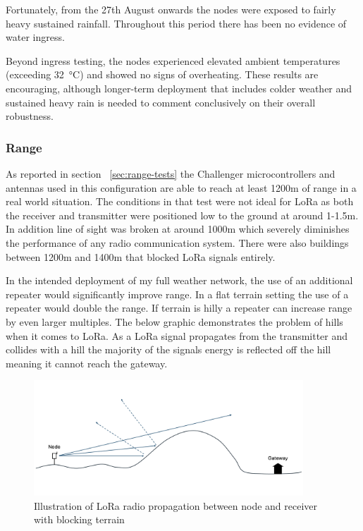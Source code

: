 Fortunately, from the 27th August onwards the nodes were exposed to fairly heavy
sustained rainfall. Throughout this period there has been no evidence of water
ingress.

Beyond ingress testing, the nodes experienced elevated ambient temperatures
(exceeding \SI{32}{\degreeCelsius}) and showed no signs of overheating. These
results are encouraging, although longer-term deployment that includes colder
weather and sustained heavy rain is needed to comment conclusively on their
overall robustness.

\subsubsection{Range}\label{sec:range-eval}

As reported in section ~\ref{sec:range-tests} the Challenger microcontrollers
and antennas used in this configuration are able to reach at least 1200m of
range in a real world situation. The conditions in that test were not ideal for
LoRa as both the receiver and transmitter were positioned low to the ground at
around 1-1.5m. In addition line of sight was broken at around 1000m which
severely diminishes the performance of any radio communication system. There
were also buildings between 1200m and 1400m that blocked LoRa signals entirely.

In the intended deployment of my full weather network, the use of an additional
repeater would significantly improve range. In a flat terrain setting the use of
a repeater would double the range. If terrain is hilly a repeater can increase
range by even larger multiples. The below graphic demonstrates the problem of
hills when it comes to LoRa. As a LoRa signal propagates from the transmitter
and collides with a hill the majority of the signals energy is reflected off the
hill meaning it cannot reach the gateway.

\begin{figure}[H]
  \centering
  \includegraphics[width=0.9\textwidth]{contents/part-4/fig4/no-repeater.png}
  \caption{Illustration of LoRa radio propagation between node and receiver with blocking terrain}
  \label{fig:no-repeater}
\end{figure}

